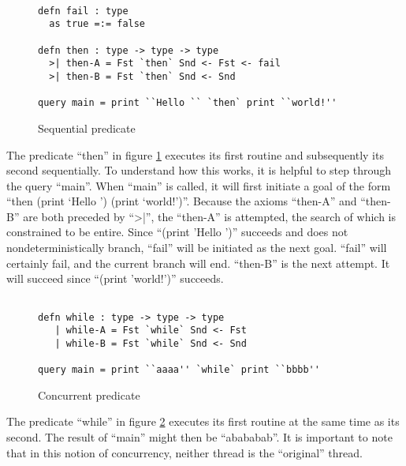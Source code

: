 \begin{figure}[H]
\begin{lstlisting}

defn fail : type
  as true =:= false

defn then : type -> type -> type
  >| then-A = Fst `then` Snd <- Fst <- fail
  >| then-B = Fst `then` Snd <- Snd

query main = print ``Hello `` `then` print ``world!''

\end{lstlisting}
\caption{Sequential predicate}
\label{nondet:seq}
\end{figure}

The predicate “then” in figure \ref{nondet:seq} executes its first routine and subsequently its second sequentially.
To understand how this works, it is helpful to step through the query
“main”. When “main” is called, it will first initiate a goal of the form “then (print ‘Hello
’) (print ‘world!’)”. Because the axioms “then-A” and “then-B” are both preceded by ``>|'',
the “then-A” is attempted, the search of which is constrained to be entire. Since “(print
’Hello ’)” succeeds and does not nondeterministically branch, “fail” will be initiated as
the next goal. ``fail'' will certainly fail, and the current branch will end. “then-B” is the
next attempt. It will succeed since “(print ’world!’)” succeeds.

\begin{figure}[H]
\begin{lstlisting}

defn while : type -> type -> type
   | while-A = Fst `while` Snd <- Fst
   | while-B = Fst `while` Snd <- Snd

query main = print ``aaaa'' `while` print ``bbbb''

\end{lstlisting}
\caption{Concurrent predicate}
\label{nondet:con}
\end{figure}


The predicate “while” in figure \ref{nondet:con} executes its first routine at the same time as its
second. The result of “main” might then be “abababab”. It is important to note that in this notion of concurrency, neither thread is the ``original'' thread.
